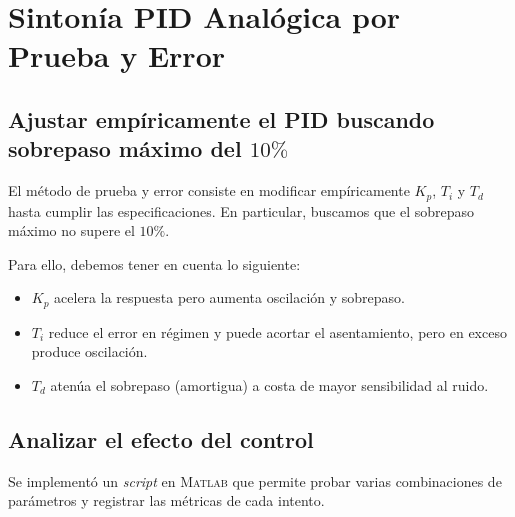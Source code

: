 \section{Sintonía PID Analógica por Prueba y Error}

\subsection{Ajustar empíricamente el PID buscando sobrepaso máximo del \texorpdfstring{$10\%$}{10\%}}

El método de prueba y error consiste en modificar empíricamente $K_p$, $T_i$ y $T_d$ hasta cumplir las especificaciones.  
En particular, buscamos que el sobrepaso máximo no supere el $10\%$.

Para ello, debemos tener en cuenta lo siguiente:
\begin{itemize}
	\item $K_p$ acelera la respuesta pero aumenta oscilación y sobrepaso.
	\item $T_i$ reduce el error en régimen y puede acortar el asentamiento, pero en exceso produce oscilación.
	\item $T_d$ atenúa el sobrepaso (amortigua) a costa de mayor sensibilidad al ruido.
\end{itemize}

\subsection{Analizar el efecto del control}

Se implementó un \textit{script} en \textsc{Matlab} que permite probar varias combinaciones de parámetros y registrar las métricas de cada intento.

